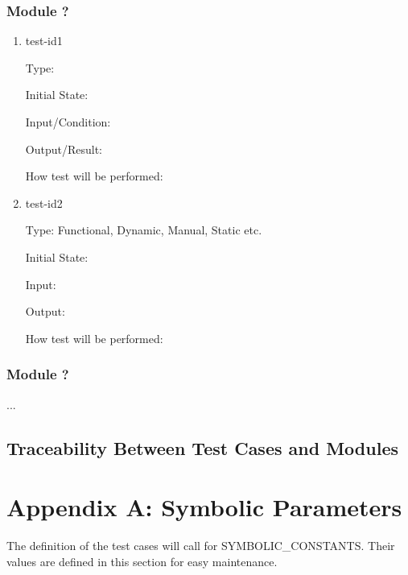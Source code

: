 \documentclass[12pt, titlepage]{article}
\begin{document}
\subsubsection{Module ?}
		
\begin{enumerate}

\item{test-id1\\}

Type: 
					
Initial State: 
					
Input/Condition: 
					
Output/Result: 
					
How test will be performed: 
					
\item{test-id2\\}

Type: Functional, Dynamic, Manual, Static etc.
					
Initial State: 
					
Input: 
					
Output: 
					
How test will be performed: 

\end{enumerate}

\subsubsection{Module ?}

...

\subsection{Traceability Between Test Cases and Modules}


\newpage

\section*{Appendix A: Symbolic Parameters}

The definition of the test cases will call for SYMBOLIC\_CONSTANTS.
Their values are defined in this section for easy maintenance.
\end{document}
